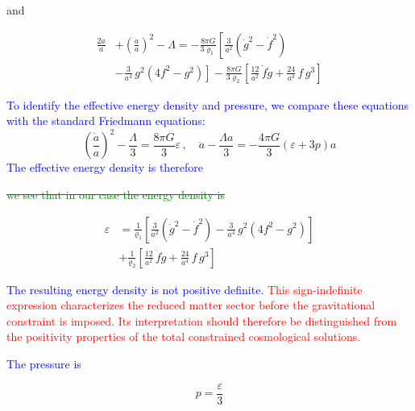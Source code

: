 \documentclass [prd,reprint,eqsecnum,nofootinbib]  {revtex4-1}
\newcommand{\corr}[1]{\textcolor{blue}{#1}}
\newcommand{\add}[1]{\textcolor{red}{#1}}
\newcommand{\del}[1]{\textcolor{green}{\sout{#1}}}
\begin{document}
and

\begin{align}

\frac{2\ddot a}{a} &+ \left(\frac{\dot a}{a}\right)^2 - \Lambda

 =-\frac{8\pi G}{3\varrho_1}\left[\frac{3}{a^2} \left(\dot g^2 - \dot

 f^2\right)\right.\nonumber\\

 &-\left.\frac{3}{a^4}\,g^2\left(4f^2-g^2\right)\right]

 -\frac{8\pi G}{3\varrho_2}\left[\frac{12}{a^2}\, \dot f \dot g +\frac{24}{a^4}\,f\, g^3\right]\label{26}

\end{align}

\corr{To identify the effective energy density and pressure, we
compare these equations with the standard Friedmann equations:}
$$

\left(\frac{\dot{a}}{a} \right)^2-\frac\Lambda3=\frac{8\pi

G}{3}\varepsilon\, , \quad \ddot a -\frac{\Lambda a}3=-\frac{4\pi

G}{3}(\varepsilon+3p)a

$$
\corr{The effective energy density is therefore}


\del{we see that in our case the energy density is}

\begin{align}

    \varepsilon&= \frac{1}{\varrho_1}\left[\frac{3}{a^2} \left(\dot g^2 - \dot

 f^2\right)

 -\frac{3}{a^4}\,g^2\left(4f^2-g^2\right)\right]\nonumber\\

 &+\frac{1}{\varrho_2}\left[\frac{12}{a^2}\, \dot f \dot g +\frac{24}{a^4}\,f\, g^3\right]\label{27}

\end{align}


\corr{The resulting energy density is not positive definite.}
\add{This sign-indefinite expression characterizes the reduced matter
sector before the gravitational constraint is imposed. Its interpretation
should therefore be distinguished from the positivity properties of
the total constrained cosmological solutions.}

\corr{The pressure is}

\begin{equation}\label{28}

    p=\frac\varepsilon3

\end{equation}
\end{document}

